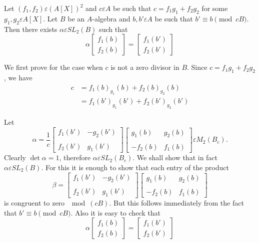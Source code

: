 \begin{lem}\label{c2:lem2.8}
Let $(f_1,f_2)\varepsilon (A[X])^{2}$ and $c\varepsilon A$ be such
that $c=f_1g_1+f_2g_2$ for some $g_1,g_2\varepsilon A[X]$. Let $B$ be
an $A$-algebra and $b,b'\varepsilon A$ be such that $b'\equiv b
\pmod{cB}$. Then there exists $\alpha\varepsilon SL_2(B)$ such that 
$$
\alpha
\begin{bmatrix}
f_1(b)\\
f_2(b)
\end{bmatrix} = \begin{bmatrix}
f_1(b')\\
f_2(b')
\end{bmatrix}
$$
\end{lem}

\begin{Proof}
We first prove for the case when $c$ is not a zero divisor in
$B$. Since $c=f_1g_1+f_2g_2$, we have
\begin{align*}
c&=f_1(b)_{g_1}(b)+f_2(b)_{g_2}(b)\\
&=f_1(b')_{g_1}(b')+f_2(b')_{g_2}(b')
\end{align*}

Let 
$$
\alpha=\frac{1}{c}
\begin{bmatrix}
f_1(b') & -g_2(b')\\
& \\
f_2(b') & g_1(b')
\end{bmatrix} \begin{bmatrix}
g_1(b) & g_2(b)\\
& \\
-f_2(b) & f_1(b)
\end{bmatrix} \varepsilon M_2(B_c).
$$
Clearly $\det \alpha=1$, therefore $\alpha\varepsilon SL_2(B_c)$. We
shall show that in fact $\alpha\varepsilon SL_2(B)$. For this it is
enough to show that each entry of the product
$$
\beta=
\begin{bmatrix}
f_1(b') & -g_2(b')\\
&\\
f_2(b') & g_1(b')
\end{bmatrix} \begin{bmatrix}
g_1(b) & g_2(b)\\
&\\
-f_2(b) & f_1(b)
\end{bmatrix}
$$
is congruent to zero $\mod (cB)$. But this follows immediately from
the fact that $b'\equiv b\pmod{cB}$. Also it is easy to check that 
$$
\alpha
\begin{bmatrix}
f_1(b)\\
f_2(b)
\end{bmatrix} = \begin{bmatrix}
f_1(b')\\
f_2(b')
\end{bmatrix}
$$


\end{Proof}
